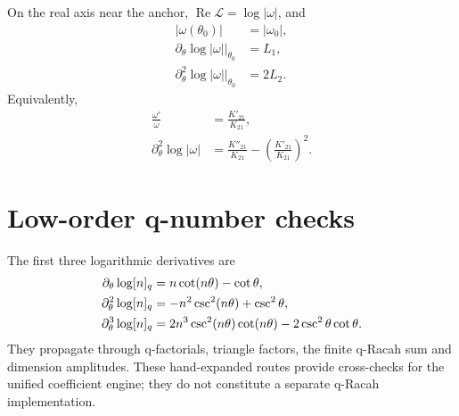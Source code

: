 \begin{corollary}
\label{cor:firstobservables}
On the real axis near the anchor, $\operatorname{Re}\mathcal L=\log|\omega|$, and
\begin{align}
|\omega(\theta_0)|&=|\omega_0|,\\
\partial_\theta\log|\omega|\big|_{\theta_0}&=L_1,\\
\partial_\theta^2\log|\omega|\big|_{\theta_0}&=2L_2.
\end{align}
Equivalently,
\begin{align}
\frac{\omega'}{\omega}&=\frac{K'_{21}}{K_{21}},\\
\partial_\theta^2\log|\omega|
&=\frac{K''_{21}}{K_{21}}-
\left(\frac{K'_{21}}{K_{21}}\right)^2.
\end{align}
\end{corollary}

\section{Low-order q-number checks}
The first three logarithmic derivatives are
\begin{align}
\partial_\theta\log[n]_q
&=n\cot(n\theta)-\cot\theta,
\label{eq:d1q}\\
\partial_\theta^2\log[n]_q
&=-n^2\csc^2(n\theta)+\csc^2\theta,
\label{eq:d2q}\\
\partial_\theta^3\log[n]_q
&=2n^3\csc^2(n\theta)\cot(n\theta)
-2\csc^2\theta\cot\theta.
\label{eq:d3q}
\end{align}
They propagate through q-factorials, triangle factors, the finite q-Racah sum and dimension amplitudes.  These hand-expanded routes provide cross-checks for the unified coefficient engine; they do not constitute a separate q-Racah implementation.
